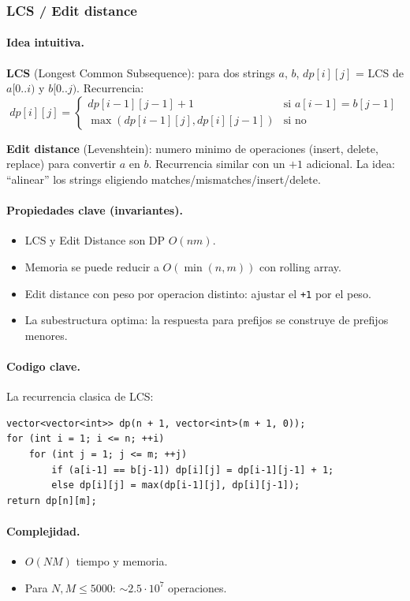 ﻿\subsubsection{LCS / Edit distance}

\paragraph{Idea intuitiva.}
\textbf{LCS} (Longest Common Subsequence): para dos strings $a$, $b$, $dp[i][j]$ = LCS de $a[0..i)$ y $b[0..j)$. Recurrencia:
\[ dp[i][j] = \begin{cases} dp[i-1][j-1] + 1 & \text{si } a[i-1] = b[j-1] \\ \max(dp[i-1][j], dp[i][j-1]) & \text{si no} \end{cases} \]

\textbf{Edit distance} (Levenshtein): numero minimo de operaciones (insert, delete, replace) para convertir $a$ en $b$. Recurrencia similar con un $+1$ adicional. La idea: ``alinear'' los strings eligiendo matches/mismatches/insert/delete.

\paragraph{Propiedades clave (invariantes).}
\begin{itemize}\setlength\itemsep{0pt}
	\item LCS y Edit Distance son DP $O(nm)$.
	\item Memoria se puede reducir a $O(\min(n, m))$ con rolling array.
	\item Edit distance con peso por operacion distinto: ajustar el \texttt{+1} por el peso.
	\item La subestructura optima: la respuesta para prefijos se construye de prefijos menores.
\end{itemize}

\paragraph{Codigo clave.}
La recurrencia clasica de LCS:
\begin{verbatim}
vector<vector<int>> dp(n + 1, vector<int>(m + 1, 0));
for (int i = 1; i <= n; ++i)
    for (int j = 1; j <= m; ++j)
        if (a[i-1] == b[j-1]) dp[i][j] = dp[i-1][j-1] + 1;
        else dp[i][j] = max(dp[i-1][j], dp[i][j-1]);
return dp[n][m];
\end{verbatim}

\paragraph{Complejidad.}
\begin{itemize}\setlength\itemsep{0pt}
	\item $O(NM)$ tiempo y memoria.
	\item Para $N, M \le 5000$: $\sim 2.5 \cdot 10^7$ operaciones.
\end{itemize}

